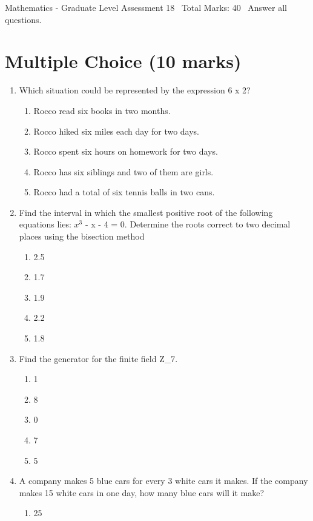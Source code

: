 \documentclass[12pt]{article}
\begin{document}
\begin{center}
Mathematics - Graduate Level Assessment 18 \
Total Marks: 40 \
Answer all questions.
\end{center}

\section*{Multiple Choice (10 marks)}
\begin{enumerate}[label=\arabic*.]
\item Which situation could be represented by the expression 6 x 2?
\begin{enumerate}[label=(\alph*)]
    \item Rocco read six books in two months.
    \item Rocco hiked six miles each day for two days.
    \item Rocco spent six hours on homework for two days.
    \item Rocco has six siblings and two of them are girls.
    \item Rocco had a total of six tennis balls in two cans.
\end{enumerate}
\item Find the interval in which the smallest positive root of the following equations lies: $x^3$ - x - 4 = 0. Determine the roots correct to two decimal places using the bisection method
\begin{enumerate}[label=(\alph*)]
    \item 2.5
    \item 1.7
    \item 1.9
    \item 2.2
    \item 1.8
\end{enumerate}
\item Find the generator for the finite field Z\_7.
\begin{enumerate}[label=(\alph*)]
    \item 1
    \item 8
    \item 0
    \item 7
    \item 5
\end{enumerate}
\item A company makes 5 blue cars for every 3 white cars it makes. If the company makes 15 white cars in one day, how many blue cars will it make?
\begin{enumerate}[label=(\alph*)]
    \item 25

\end{enumerate}
\end{enumerate}
\end{document}
